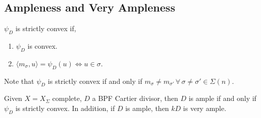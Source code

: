 \documentclass[a4paper,12pt]{amsart}
\begin{document}
\subsection{Ampleness and Very Ampleness}
\begin{definition}
	$\psi_D$ is strictly convex if,
	\begin{enumerate}
		\item $\psi_D$ is convex.
		\item $\langle m_\sigma, u \rangle = \psi_D(u) \Leftrightarrow u \in \sigma$.
	\end{enumerate}
\end{definition}
Note that $\psi_D$ is strictly convex if and only if $m_\sigma \neq m_{\sigma'} \, \forall \, \sigma \neq \sigma' \in \Sigma(n)$.

\begin{theorem}
	Given $X=X_\Sigma$ complete, $D$ a BPF Cartier divisor, then $D$ is ample if and only if $\psi_D$ is strictly convex. In addition, if $D$ is ample, then $kD$ is very ample.
\end{theorem}
\end{document}
